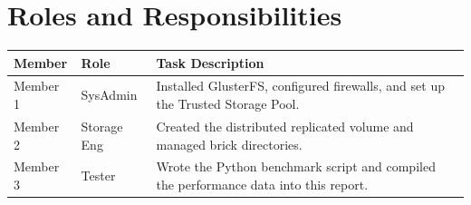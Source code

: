 \documentclass[a4paper,11pt]{article}
\begin{document}
\section{Roles and Responsibilities}
\begin{table}[h]
\centering
\begin{tabular}{|l|l|p{7cm}|}
\hline
\textbf{Member} & \textbf{Role} & \textbf{Task Description} \\ \hline
Member 1 & SysAdmin & Installed GlusterFS, configured firewalls, and set up the Trusted Storage Pool. \\ \hline
Member 2 & Storage Eng & Created the distributed replicated volume and managed brick directories. \\ \hline
Member 3 & Tester & Wrote the Python benchmark script and compiled the performance data into this report. \\ \hline
\end{tabular}
\end{table}
\end{document}
